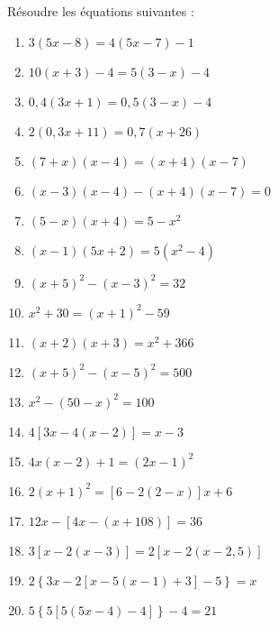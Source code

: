 \begin{exercice}Résoudre les équations suivantes :
\begin{enumerate}
\item $3\left( 5x-8 \right)=4\left( 5x-7 \right)-1$
\item $10\left( x+3 \right)-4=5\left( 3-x \right)-4$
\item $0,4\left( 3x+1 \right)=0,5\left( 3-x \right)-4$
\item $2\left( 0,3x+11 \right)=0,7\left( x+26 \right)$	
\item $\left( 7+x \right)\left( x-4 \right)=\left( x+4 \right)\left( x-7 \right)$	
\item $\left( x-3 \right)\left( x-4 \right)-\left( x+4 \right)\left( x-7 \right)=0$	
\item $\left( 5-x \right)\left( x+4 \right)=5-{{x}^{2}}$	
\item $\left( x-1 \right)\left( 5x+2 \right)=5\left( {{x}^{2}}-4 \right)$	
\item ${{\left( x+5 \right)}^{2}}-{{\left( x-3 \right)}^{2}}=32$	
\item ${{x}^{2}}+30={{\left( x+1 \right)}^{2}}-59$	
\item $\left( x+2 \right)\left( x+3 \right)={{x}^{2}}+366$
\item ${{\left( x+5 \right)}^{2}}-{{\left( x-5 \right)}^{2}}=500$
\item ${{x}^{2}}-{{\left( 50-x \right)}^{2}}=100$
\item $4\left[ 3x-4\left( x-2 \right) \right]=x-3$
\item $4x\left( x-2 \right)+1={{\left( 2x-1 \right)}^{2}}$
\item $2{{\left( x+1 \right)}^{2}}=\left[ 6-2\left( 2-x \right) \right]x+6$
\item $12x-\left[ 4x-\left( x+108 \right) \right]=36$
\item $3\left[ x-2\left( x-3 \right) \right]=2\left[ x-2\left( x-2,5 \right) \right]$
\item $2\left\{ 3x-2\left[ x-5\left( x-1 \right)+3 \right]-5 \right\}=x$
\item $5\left\{ 5\left[ 5\left( 5x-4 \right)-4 \right] \right\}-4=21$
\end{enumerate}
\end{exercice}

